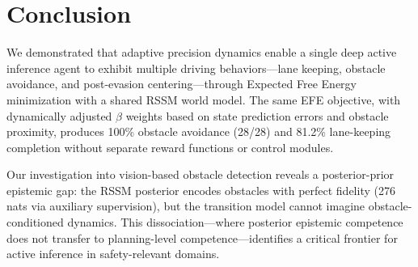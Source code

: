 \documentclass{article}
\begin{document}
\section{Conclusion}

We demonstrated that adaptive precision dynamics enable a single
deep active inference agent to exhibit multiple driving
behaviors---lane keeping, obstacle avoidance, and post-evasion
centering---through Expected Free Energy minimization with a
shared RSSM world model. The same EFE objective, with dynamically
adjusted $\beta$ weights based on state prediction errors and
obstacle proximity, produces 100\% obstacle avoidance (28/28) and
81.2\% lane-keeping completion without separate reward functions
or control modules.

Our investigation into vision-based obstacle detection reveals a
posterior-prior epistemic gap: the RSSM posterior encodes obstacles
with perfect fidelity (276 nats via auxiliary supervision), but the
transition model cannot imagine obstacle-conditioned dynamics. This
dissociation---where posterior epistemic competence does not
transfer to planning-level competence---identifies a critical
frontier for active inference in safety-relevant domains.



\end{document}
